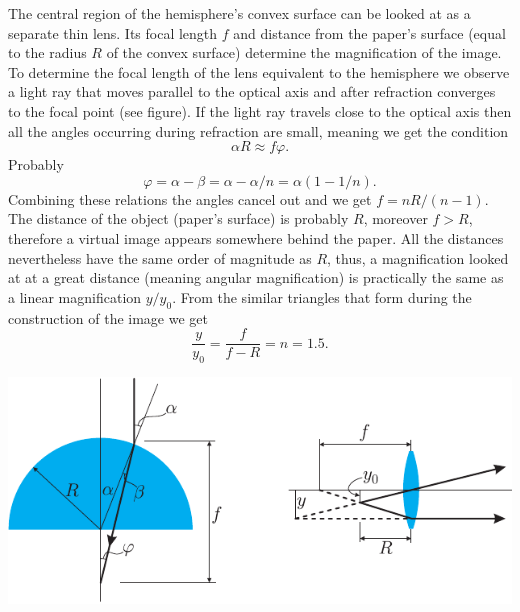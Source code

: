\documentclass[11pt]{article}
\begin{document}
\solueng
The central region of the hemisphere’s convex surface can be looked at as a separate thin lens. Its focal length $f$ and distance from the paper’s surface (equal to the radius $R$ of the convex surface) determine the magnification of the image. To determine the focal length of the lens equivalent to the hemisphere we observe a light ray that moves parallel to the optical axis and after refraction converges to the focal point (see figure). If the light ray travels close to the optical axis then all the angles occurring during refraction are small, meaning we get the condition
\[
\alpha R\approx f\varphi.
\]
Probably
\[
\varphi = \alpha - \beta=\alpha-\alpha/n=\alpha(1-1/n).
\]
Combining these relations the angles cancel out and we get $f=nR/(n-1)$. The distance of the object (paper’s surface) is probably $R$, moreover $f > R$, therefore a virtual image appears somewhere behind the paper. All the distances nevertheless have the same order of magnitude as $R$, thus, a magnification looked at at a great distance (meaning angular magnification) is practically the same as a linear magnification $y/y_0$. From the similar triangles that form during the construction of the image we get
\[
\frac{y}{y_0}=\frac{f}{f-R}=n=\num{1.5}.
\]  
\begin{center}
	\includegraphics[scale=1.2]{2016-v3g-06-luup-lah}
\end{center}
\probend
\bigskip

\end{document}
